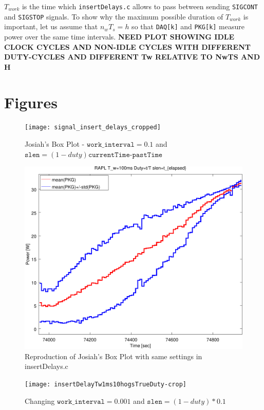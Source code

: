 \documentclass{article}
\begin{document}
$T_{work}$ is the time which \texttt{insertDelays.c} allows to pass between sending \texttt{SIGCONT} and \texttt{SIGSTOP} signals.  To show why the maximum possible duration of $T_{work}$ is important, let us assume that $n_wT_s=h$ so that \texttt{DAQ[k]} and \texttt{PKG[k]} measure power over the same time intervals.  \textbf{NEED PLOT SHOWING IDLE CLOCK CYCLES AND NON-IDLE CYCLES WITH DIFFERENT DUTY-CYCLES AND DIFFERENT Tw RELATIVE TO NwTS AND H} \\

\section{Figures}
\begin{figure}
    \centering
    \texttt{[image: signal\_insert\_delays\_cropped]}
    \caption{Josiah's Box Plot - $\texttt{work\_interval}=0.1$ and $\texttt{slen}=(1-duty)\texttt{currentTime-pastTime}$}
    \label{fig:josiahsSignalInsert}
\end{figure}
\begin{figure}
    \centering
    \includegraphics[width=\textwidth]{insertDelayTw100msPKGOldSlenCropped}
    \caption{Reproduction of Josiah's Box Plot with same settings in insertDelays.c}
    \label{fig:reproduction}
\end{figure}
\begin{figure}
    \centering
    \texttt{[image: insertDelayTw1ms10hogsTrueDuty-crop]}
    \caption{Changing $\texttt{work\_interval}=0.001$ and $\texttt{slen}=(1-duty)*0.1$}
    \label{fig:trueDuty}
\end{figure}
\end{document}
